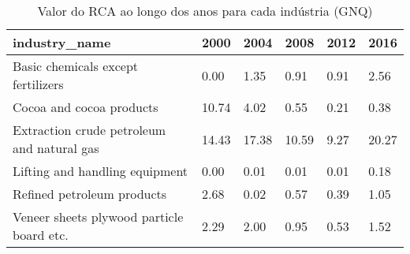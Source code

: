 \begin{table}
\centering
\caption{Valor do RCA ao longo dos anos para cada indústria (GNQ)}
\begin{tabular}{p{6cm}p{1.5cm}p{1.5cm}p{1.5cm}p{1.5cm}p{1.5cm}}
\toprule
                             industry\_name &  2000 &  2004 &  2008 & 2012 &  2016 \\
\midrule
        Basic chemicals except fertilizers &  0.00 &  1.35 &  0.91 & 0.91 &  2.56 \\
                  Cocoa and cocoa products & 10.74 &  4.02 &  0.55 & 0.21 &  0.38 \\
Extraction crude petroleum and natural gas & 14.43 & 17.38 & 10.59 & 9.27 & 20.27 \\
            Lifting and handling equipment &  0.00 &  0.01 &  0.01 & 0.01 &  0.18 \\
                Refined petroleum products &  2.68 &  0.02 &  0.57 & 0.39 &  1.05 \\
 Veneer sheets plywood particle board etc. &  2.29 &  2.00 &  0.95 & 0.53 &  1.52 \\
\bottomrule
\end{tabular}
\end{table}
